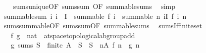 \begin{isabellebody}
%
\isadelimproof
\ \ %
\endisadelimproof
%
\isatagproof
{}\isamarkupfalse%
\ sums{\isacharunderscore}{\kern0pt}unique{\isacharbrackleft}{\kern0pt}OF\ sums{\isacharunderscore}{\kern0pt}sum{\isacharcomma}{\kern0pt}\ OF\ summable{\isacharunderscore}{\kern0pt}sums{\isacharbrackright}{\kern0pt}\ \isamarkupfalse%
\ simp%
\endisatagproof
{\isafoldproof}%
%
\isadelimproof
\isanewline
%
\endisadelimproof
\isanewline
{}\isamarkupfalse%
\ summable{\isacharunderscore}{\kern0pt}sum{\isacharcolon}{\kern0pt}\ {\isachardoublequoteopen}{\isacharparenleft}{\kern0pt}{\isasymAnd}i{\isachardot}{\kern0pt}\ i\ {\isasymin}\ I\ {\isasymLongrightarrow}\ summable\ {\isacharparenleft}{\kern0pt}f\ i{\isacharparenright}{\kern0pt}{\isacharparenright}{\kern0pt}\ {\isasymLongrightarrow}\ summable\ {\isacharparenleft}{\kern0pt}{\isasymlambda}n{\isachardot}{\kern0pt}\ {\isasymSum}i{\isasymin}I{\isachardot}{\kern0pt}\ f\ i\ n{\isacharparenright}{\kern0pt}{\isachardoublequoteclose}\isanewline
%
\isadelimproof
\ \ %
\endisadelimproof
%
\isatagproof
{}\isamarkupfalse%
\ sums{\isacharunderscore}{\kern0pt}summable{\isacharbrackleft}{\kern0pt}OF\ sums{\isacharunderscore}{\kern0pt}sum{\isacharbrackleft}{\kern0pt}OF\ summable{\isacharunderscore}{\kern0pt}sums{\isacharbrackright}{\kern0pt}{\isacharbrackright}{\kern0pt}\ \isacommand{{\isachardot}{\kern0pt}}\isamarkupfalse%
%
\endisatagproof
{\isafoldproof}%
%
\isadelimproof
\isanewline
%
\endisadelimproof
\isanewline
{}\isamarkupfalse%
\isanewline
\isanewline
{}\isamarkupfalse%
\ sums{\isacharunderscore}{\kern0pt}If{\isacharunderscore}{\kern0pt}finite{\isacharunderscore}{\kern0pt}set{\isacharprime}{\kern0pt}{\isacharcolon}{\kern0pt}\isanewline
\ \ \ f\ g\ {\isacharcolon}{\kern0pt}{\isacharcolon}{\kern0pt}\ {\isachardoublequoteopen}nat\ {\isasymRightarrow}\ {\isacharprime}{\kern0pt}a{\isacharcolon}{\kern0pt}{\isacharcolon}{\kern0pt}{\isacharbraceleft}{\kern0pt}t{}{\isacharunderscore}{\kern0pt}space{\isacharcomma}{\kern0pt}topological{\isacharunderscore}{\kern0pt}ab{\isacharunderscore}{\kern0pt}group{\isacharunderscore}{\kern0pt}add{\isacharbraceright}{\kern0pt}{\isachardoublequoteclose}\isanewline
\ \ \ {\isachardoublequoteopen}g\ sums\ S{\isachardoublequoteclose}\ \ {\isachardoublequoteopen}finite\ A{\isachardoublequoteclose}\ \ {\isachardoublequoteopen}S{\isacharprime}{\kern0pt}\ {\isacharequal}{\kern0pt}\ S\ {\isacharplus}{\kern0pt}\ {\isacharparenleft}{\kern0pt}{\isasymSum}n{\isasymin}A{\isachardot}{\kern0pt}\ f\ n\ {\isacharminus}{\kern0pt}\ g\ n{\isacharparenright}{\kern0pt}{\isachardoublequoteclose}\isanewline

\end{isabellebody}
